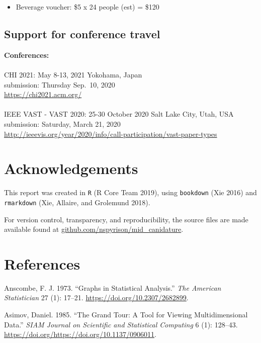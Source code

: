 \documentclass[
  11,
]{article}
\providecommand{\tightlist}{%
  \setlength{\itemsep}{0pt}\setlength{\parskip}{0pt}}
\begin{document}
\begin{itemize}
\tightlist
\item
  Beverage voucher: \$5 x 24 people (est) = \$120
\end{itemize}

\hypertarget{support-for-conference-travel}{%
\subsection{Support for conference travel}\label{support-for-conference-travel}}

\textbf{Conferences:}\\
~\\
CHI 2021: May 8-13, 2021 Yokohama, Japan\\
submission: Thursday Sep.~10, 2020\\
\url{https://chi2021.acm.org/}~\\
~\\
IEEE VAST - VAST 2020: 25-30 October 2020 Salt Lake City, Utah, USA\\
submission: Saturday, March 21, 2020\\
\url{http://ieeevis.org/year/2020/info/call-participation/vast-paper-types}

\hypertarget{sec:acknowledgements}{%
\section{Acknowledgements}\label{sec:acknowledgements}}

This report was created in \texttt{R} (R Core Team 2019), using \texttt{bookdown} (Xie 2016) and \texttt{rmarkdown} (Xie, Allaire, and Grolemund 2018).

For version control, transparency, and reproducibility, the source files are made available found at \href{https://github.com/nspyrison/mid_canidature}{github.com/nspyrison/mid\_canidature}.

\hypertarget{references}{%
\section*{References}\label{references}}

\hypertarget{refs}{}
\leavevmode\hypertarget{ref-anscombe_graphs_1973}{}%
Anscombe, F. J. 1973. ``Graphs in Statistical Analysis.'' \emph{The American Statistician} 27 (1): 17--21. \url{https://doi.org/10.2307/2682899}.

\leavevmode\hypertarget{ref-asimov_grand_1985}{}%
Asimov, Daniel. 1985. ``The Grand Tour: A Tool for Viewing Multidimensional Data.'' \emph{SIAM Journal on Scientific and Statistical Computing} 6 (1): 128--43. \url{https://doi.org/https://doi.org/10.1137/0906011}.
\end{document}
